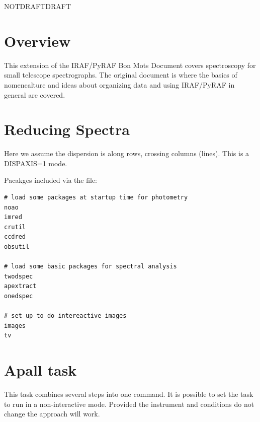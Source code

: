 \documentclass[letter,11pt,oneside]{article}
\def\documentisdraft{NOTDRAFT}
\def\drafttest{DRAFT}
\newcommand{\dhlv}[1]{{\color{verbcolor}{#1}}}
\begin{document}
\clearpage

\setcounter{section}{1}

\ifx\documentisdraft\drafttest
\linenumbers    %
\fi

\clearpage
{}


\section*{Overview}

This extension of the IRAF/PyRAF Bon Mots Document covers spectroscopy
for small telescope spectrographs. The original document is where the
basics of nomencalture and ideas about organizing data and using
IRAF/PyRAF in general are covered.


\section{Reducing Spectra}

Here we assume the dispersion is along rows, crossing columns (lines).
This is a DISPAXIS=1 mode.

Pacakges included via the \dhlv{$\sim$/iraf/loginuser.cl} file:

\begingroup \fontsize{10pt}{10pt}
\selectfont
\begin{verbatim} 
# load some packages at startup time for photometry
noao
imred
crutil
ccdred
obsutil

# load some basic packages for spectral analysis
twodspec
apextract
onedspec  

# set up to do intereactive images
images
tv     
\end{verbatim}
\endgroup




\appendix \renewcommand {}

\section{Apall task}

This task combines several steps into one command. It is possible to 
set the task to run in a non-interactive mode. Provided the instrument
and conditions do not change the approach will work.
\end{document}
